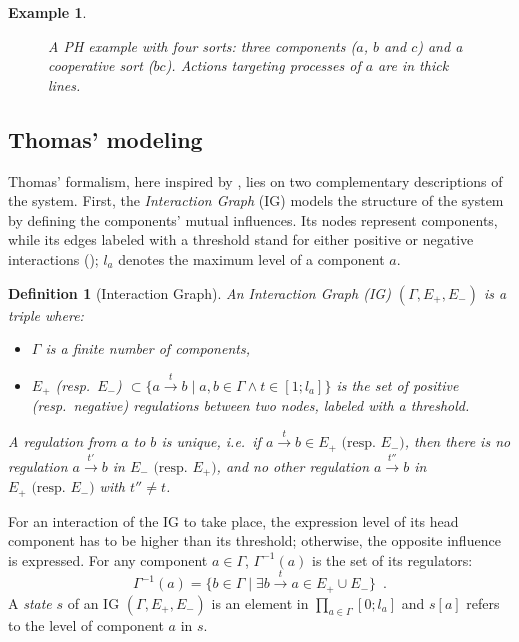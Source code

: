\documentclass[11pt,a4paper,twoside]{epig}
\makeatletter
\def\pref{\prettyref}
\newtheorem{example}{Example}{\itshape}{}
\newtheorem{definition}{Definition}{\itshape}{}
\def\PHget#1#2{{#1[#2]}}
\newcommand{\GRNreg}[1]{\Gamma^{-1}(#1)}
\newcommand{\GRNget}[2]{\PHget{#1}{#2}}
\newcounter{la}
\newcommand{\repcommand}[2]{
  \providecommand{#1}{#2}
  \renewcommand{#1}{#2}
}
\newcommand{\THit}[5]{
  \path[hit] (#1) edge[#2] (#3#4);
  \expandafter\repcommand\expandafter{\csname TBounce@#3@#5\endcsname}{#4}
}
\newcommand{\TBounce}[4]{
  (#1\csname TBounce@#1@#3\endcsname) edge[#2] (#3#4)
}
\newcommand{\ie}{i.e.\ }
\newcommand{\resp}{resp.\ }
\makeatother
\begin{document}
\begin{example}
\begin{figure}[ht]
{
}

\caption{\label{fig:runningPH}
A PH example with four sorts: three components ($a$, $b$ and $c$) and a cooperative sort ($bc$).
Actions targeting processes of $a$ are in thick lines.
}
\end{figure}
\end{example}

%
\subsection{Thomas' modeling}
Thomas' formalism, here inspired by \cite{Richard06,BernotSemBRN}, lies on two complementary descriptions of the system.
First, the \emph{Interaction Graph} (IG) models the structure of the system by defining the components' mutual influences.
Its nodes represent components, while its edges labeled with a threshold stand for either positive or negative interactions (\pref{def:ig});
$l_a$ denotes the maximum level of a component $a$.

\begin{definition}[Interaction Graph]
\label{def:ig}
An \emph{Interaction Graph} (IG) $(\Gamma, E_+, E_-)$ is a triple where:
\begin{itemize}
  \item $\Gamma$ is a finite number of \emph{components},
  \item $E_+$ (\resp $E_-$) $\subset \{a \xrightarrow{t} b \mid a, b \in \Gamma \wedge t \in [1; l_a]\}$
    is the set of positive (\resp negative) \emph{regulations} between two nodes, labeled with a \emph{threshold}.
\end{itemize}
A regulation from $a$ to $b$ is unique, \ie if $a \xrightarrow{t} b \in E_+ \text{ (resp. $E_-$)}$,
then there is no regulation $a \xrightarrow{t'} b$ in $E_- \text{ (resp. $E_+$)}$,
and no other regulation $a \xrightarrow{t''} b$ in $E_+ \text{ (resp. $E_-$)}$ with $t'' \not= t$.
\end{definition}

\noindent
For an interaction of the IG to take place, the expression level of its head component has to be higher than its threshold; otherwise, the opposite influence is expressed.
For any component $a \in \Gamma$, $\GRNreg{a}$ is the set of its regulators:
$$\GRNreg{a} = \{ b\in\Gamma\mid \exists b\xrightarrow t a\in E_+\cup E_- \} \enspace.$$
A \emph{state} $s$ of an IG $(\Gamma, E_+, E_-)$ is an element in $\prod_{a \in \Gamma} [0;l_a]$
and $\GRNget{s}{a}$ refers to the level of component $a$ in $s$.
\end{document}
